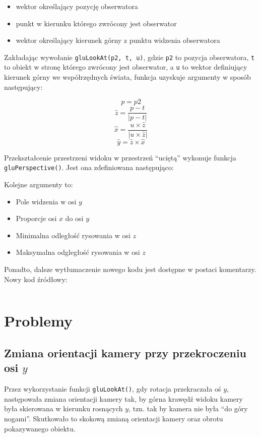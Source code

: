 \documentclass[a4paper]{article}
\begin{document}
\begin{itemize}
    \item wektor określający pozycję obserwatora
    \item punkt w kierunku którego zwrócony jest obserwator
    \item wektor określający kierunek górny z punktu widzenia obserwatora
\end{itemize}

Zakładając wywołanie \texttt{gluLookAt(p2, t, u)}, gdzie \verb|p2| to pozycja
obserwatora, \verb|t| to obiekt w stronę którego zwrócony jest obserwator, a
\verb|u| to wektor definiujący kierunek górny we współrzędnych świata, funkcja
uzyskuje argumenty w sposób następujący:

\[p = p2\]
\[\hat{z} = \frac{p - t}{|p-t|}\]
\[\hat{x} = \frac{u \times \hat{z}}{|u \times \hat{z}|}\]
\[\hat{y} = \hat{z} \times \hat{x}\]

Przekształcenie przestrzeni widoku w przestrzeń ``uciętą'' wykonuje funkcja
\texttt{gluPerspective()}. Jest ona zdefiniowana następująco:


Kolejne argumenty to:

\begin{itemize}
    \item Pole widzenia w osi $y$
    \item Proporcje osi $x$ do osi $y$
    \item Minimalna odległość rysowania w osi $z$
    \item Maksymalna odgległość rysowania w osi $z$
\end{itemize}

Ponadto, dalsze wytłumaczenie nowego kodu jest dostępne w postaci komentarzy.
Nowy kod źródłowy:

\inputminted{C}{funcs.c}

\section{Problemy}

\subsection{Zmiana orientacji kamery przy przekroczeniu osi $y$}

Przez wykorzystanie funkcji \verb|gluLookAt()|, gdy rotacja przekraczała oś $y$,
następowała zmiana orientacji kamery tak, by górna krawędź widoku kamery była
skierowana w kierunku rosnących $y$, tzn. tak by kamera nie była ``do góry
nogami''. Skutkowało to skokową zmianą orientacji kamery oraz obrotu pokazywanego
obiektu.
\end{document}
